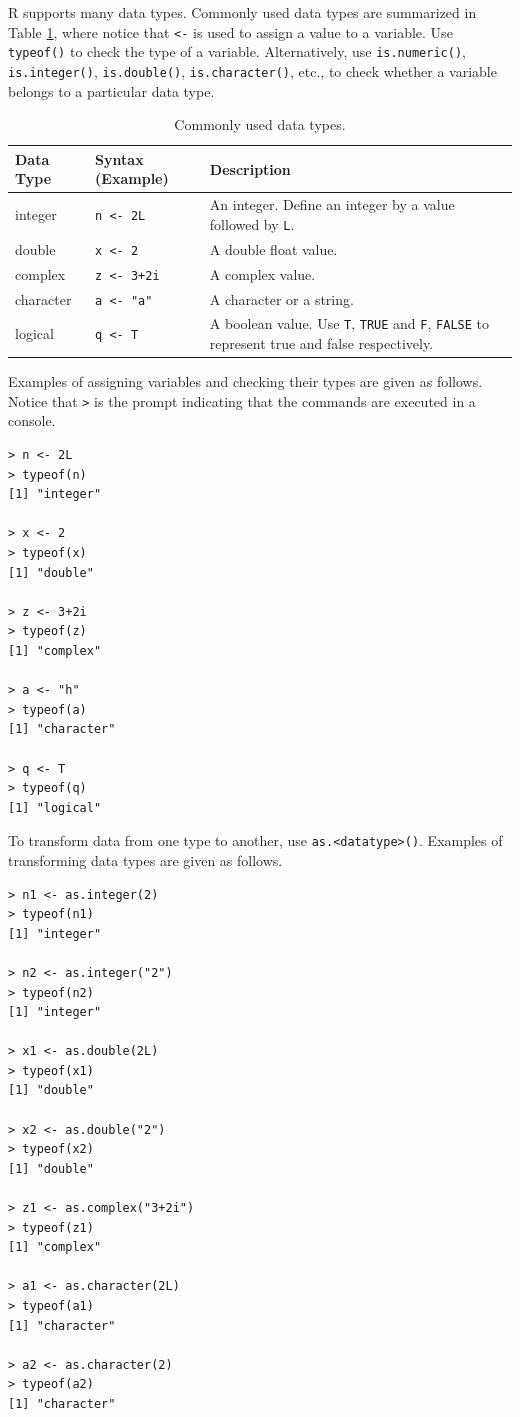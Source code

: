 R supports many data types. Commonly used data types are summarized in Table \ref{ch:r1:tab:datatype}, where notice that \verb|<-| is used to assign a value to a variable. Use \verb|typeof()| to check the type of a variable. Alternatively, use \verb|is.numeric()|, \verb|is.integer()|, \verb|is.double()|, \verb|is.character()|, etc., to check whether a variable belongs to a particular data type.
\begin{table}[!htb]
  \centering \caption{Commonly used data types.}\label{ch:r1:tab:datatype}
  \begin{tabularx}{\textwidth}{llX}
    \hline
    Data Type & Syntax (Example) & Description \\ \hline
    integer & \verb|n <- 2L| & An integer. Define an integer by a value followed by \verb|L|. \\
    double & \verb|x <- 2| & A double float value. \\
    complex & \verb|z <- 3+2i| & A complex value. \\
    character & \verb|a <- "a"| & A character or a string. \\
    logical & \verb|q <- T| & A boolean value. Use \verb|T|, \verb|TRUE| and \verb|F|, \verb|FALSE| to represent true and false respectively. \\
    \hline
  \end{tabularx}
\end{table}

Examples of assigning variables and checking their types are given as follows. Notice that \verb|>| is the prompt indicating that the commands are executed in a console.
\begin{lstlisting}
> n <- 2L
> typeof(n)
[1] "integer"

> x <- 2
> typeof(x)
[1] "double"

> z <- 3+2i
> typeof(z)
[1] "complex"

> a <- "h"
> typeof(a)
[1] "character"

> q <- T
> typeof(q)
[1] "logical"
\end{lstlisting}

To transform data from one type to another, use \verb|as.<datatype>()|. Examples of transforming data types are given as follows.
\begin{lstlisting}
> n1 <- as.integer(2)
> typeof(n1)
[1] "integer"

> n2 <- as.integer("2")
> typeof(n2)
[1] "integer"

> x1 <- as.double(2L)
> typeof(x1)
[1] "double"

> x2 <- as.double("2")
> typeof(x2)
[1] "double"

> z1 <- as.complex("3+2i")
> typeof(z1)
[1] "complex"

> a1 <- as.character(2L)
> typeof(a1)
[1] "character"

> a2 <- as.character(2)
> typeof(a2)
[1] "character"
\end{lstlisting}

